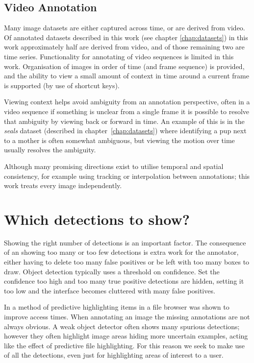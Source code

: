 \subsection {Video Annotation}

Many image datasets are either captured across time, or are derived from video. Of annotated datasets described in this work (see chapter \ref{chap:datasets}) in this work approximately half are derived from video, and of those remaining two are time series. Functionality for annotating of video sequences is limited in this work. Organisation of images in order of time (and frame sequence) is provided, and the ability to view a small amount of context in time around a current frame is supported (by use of shortcut keys).

Viewing context helps avoid ambiguity from an annotation perspective, often in a video sequence if something is unclear from a single frame it is possible to resolve that ambiguity by viewing back or forward in time. An example of this is in the \emph{seals} dataset (described in chapter~\ref{chap:datasets}) where identifying a pup next to a mother is often somewhat ambiguous, but viewing the motion over time usually resolves the ambiguity.

Although many promising directions exist to utilise temporal and spatial consistency, for example using tracking or interpolation between annotations; this work treats every image independently. 


\section {Which detections to show?}
\label{sec:thresholding}

Showing the right number of detections is an important factor. The consequence of an showing too many or too few detections is extra work for the annotator, either having to delete too many false positives or be left with too many boxes to draw. Object detection typically uses a threshold on confidence. Set the confidence too high and too many true positive detections are hidden, setting it too low and the interface becomes cluttered with many false positives.

In \cite{Fitchett2013} a method of predictive highlighting items in a file browser was shown to improve access times. When annotating an image the missing annotations are not always obvious. A weak object detector often shows many spurious detections; however they often highlight image areas hiding more uncertain examples, acting like the effect of predictive file highlighting. For this reason we seek to make use of all the detections, even just for highlighting areas of interest to a user. 

